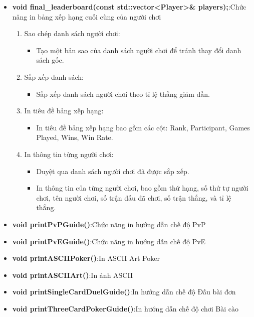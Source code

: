 \documentclass{article}
\begin{document}
\begin{itemize}
    
    \item \textbf{void final\_leaderboard(const std::vector<Player>\& players);}:Chức năng in bảng xếp hạng cuối cùng của người chơi
    \begin{description}
            \begin{enumerate}
            \item Sao chép danh sách người chơi:
                \begin{itemize}
                    \item Tạo một bản sao của danh sách người chơi để tránh thay đổi danh sách gốc.
                \end{itemize}
            \item Sắp xếp danh sách:
                \begin{itemize}
                    \item Sắp xếp danh sách người chơi theo tỉ lệ thắng giảm dần.
                \end{itemize}
            \item In tiêu đề bảng xếp hạng:
                \begin{itemize}
                    \item In tiêu đề bảng xếp hạng bao gồm các cột: Rank, Participant, Games Played, Wins, Win Rate.
                \end{itemize}
            \item In thông tin từng người chơi:
                \begin{itemize}
                    \item Duyệt qua danh sách người chơi đã được sắp xếp.
                    \item In thông tin của từng người chơi, bao gồm thứ hạng, số thứ tự người chơi, tên người chơi, số trận đấu đã chơi, số trận thắng, và tỉ lệ thắng.
                \end{itemize}
        \end{enumerate}
    \end{description}
    
    \item \textbf{void printPvPGuide()}:Chức năng in hướng dẫn chế độ PvP
    \item \textbf{void printPvEGuide()}:Chức năng in hướng dẫn chế độ PvE
    \item \textbf{void printASCIIPoker()}:In ASCII Art Poker
    \item \textbf{void printASCIIArt()}:In ảnh ASCII
    \item \textbf{void printSingleCardDuelGuide()}:In hướng dẫn chế độ Đấu bài đơn
    \item \textbf{void printThreeCardPokerGuide()}:In hướng dẫn chế độ chơi Bài cào

\end{itemize}
\end{document}
